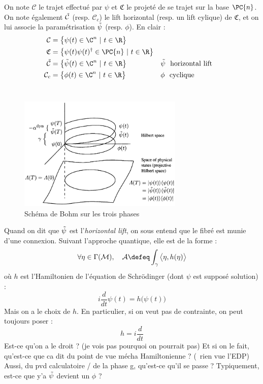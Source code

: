 On note $\mathcal{C}$ le trajet effectué par $\psi$ et $\mathfrak{C}$ le projeté de se trajet sur la base $\PC{n}$. On note également $\Tilde{\mathcal{C}}$ (resp. $\mathcal{C}_c$) le lift horizontal (resp. un lift cylique) de $\mathfrak{C}$, et on lui associe la paramétrisation $\Tilde{\psi}$ (resp. $\phi$). En clair :
\begin{align*}
	\mathcal{C} &= \big\{ \psi(t)\in\C^n\ |\  t\in\R \big\} \\
	\mathfrak{C} &= \big\{ \psi(t) \psi(t)^\dagger \in\PC{n}\ |\  t\in\R \big\} \\
	\Tilde{\mathcal{C}} &= \big\{ \Tilde{\psi}(t)\in\C^n\ |\  t\in\R \big\}  &  &\Tilde{\psi}\ \text{ horizontal lift}\\
	\mathcal{C}_c &= \big\{ \phi(t)\in\C^n\ |\  t\in\R \big\}  &  &\phi\ \text{ cyclique}
\end{align*}
\\
\begin{figure}[h]\centering
	\includegraphics[width=0.7\textwidth]{fig/schéma2Bohm}
	\caption{Schéma de Bohm \cite{bohm_geometric_2003} sur les trois phases}
	\label{fig:2lifts}
\end{figure}

Quand on dit que $\Tilde{\psi}$ est l'\textit{horizontal lift}, on sous entend que le fibré est munie d'une connexion. Suivant l'approche quantique, elle est de la forme :
\[\forall \eta\in\Gamma(\mathcal{M}),\quad  \mathcal{A} \defeq \int_\gamma \big\langle \eta, h(\eta) \big\rangle\]
où $h$ est l'Hamiltonien de l'équation de Schrödinger (dont $\psi$ est supposé solution) :
\begin{equation}\label{eq:schrodinger}
	i\frac{d}{dt} \psi(t) = h\big(\psi(t)\big)
\end{equation}
Mais on a le choix de $h$. En particulier, si on veut pas de contrainte, on peut toujours poser :
\[h = i\frac{d}{dt}\]
Est-ce qu'on a le droit ? (je vois pas pourquoi on pourrait pas) Et si on le fait, qu'est-ce que ca dit du point de vue mécha Hamiltonienne ? (\apriori~rien vue l'EDP)
\\
Aussi, du pvd calculatoire / de la phase g, qu'est-ce qu'il se passe ? Typiquement, est-ce que y'a $\Tilde{\psi}$ devient un $\phi$ ?
\\

